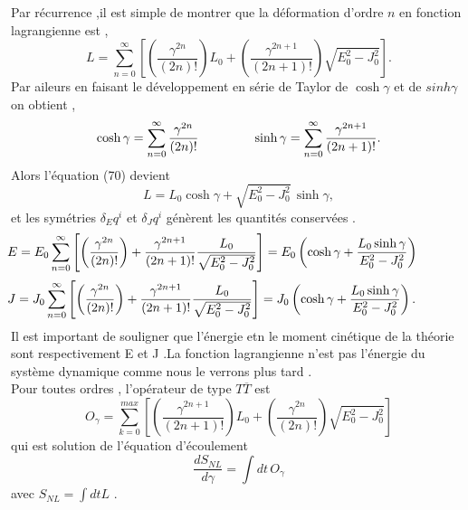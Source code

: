 \documentclass[12pt,a4paper, openany]{article}
\begin{document}
   \hspace{0.5cm}Par récurrence ,il est simple de montrer que la déformation d'ordre $n$ en fonction lagrangienne est ,
   \begin{equation}
   L=\sum_{n=0}^{\infty}\left[\left(\frac{\gamma^{2n}}{(2n)!}\right)L_0+\left(\frac{\gamma^{2n+1
   }}{(2n+1)!}\right)\sqrt{E^2_0-J_0^2}\right] .
   \end{equation}
   Par aileurs en faisant le développement en série de Taylor  de $\cosh{\gamma}$ et de $sinh{\gamma}$ on obtient ,
   \begin{equation}
   	\cosh{\gamma}=\sum_{n=0}^{\infty}\frac{\gamma^{2n}}{(2n)!} \hspace{1.5cm} \sinh{\gamma}=\sum_{n=0}^{\infty} \frac{\gamma^{2n+1
   	}}{(2n+1)!} .
   \end{equation}
   Alors l'équation (70) devient 
   \begin{equation}
   L=L_0\cosh{\gamma}+\sqrt{E^2_0-J_0^2} \,\sinh{\gamma} ,
   \end{equation}
    et les symétries $ \delta_{E}q^{i}$ et $\delta_{J}q^i$ génèrent les quantités conservées .
    \begin{equation}
   \hspace{-1.5cm} E=E_0\sum_{n=0}^{\infty}\left[\left(\frac{\gamma^{2n}}{(2n)!}\right)+\frac{
    	\gamma^{2n+1}}{(2n+1)!}\frac{L_0}{\sqrt{E^2_0-J_0^2}}\right]=E_0\left(\cosh{\gamma}+\frac{L_0\sinh{\gamma}}{E^2_0-J_0^2}\right)
    \end{equation}
    \begin{equation}
    \hspace{-1.5cm}	J=J_0\sum_{n=0}^{\infty}\left[\left(\frac{\gamma^{2n}}{(2n)!}\right)+\frac{
    		\gamma^{2n+1}}{(2n+1)!}\frac{L_0}{\sqrt{E^2_0-J_0^2}}\right]=J_0\left(\cosh{\gamma}+\frac{L_0\sinh{\gamma}}{E^2_0-J_0^2}\right) .
    \end{equation}
    	Il est important de souligner que l'énergie etn le moment cinétique de la théorie sont respectivement E et J .La fonction lagrangienne n'est pas l'énergie du système dynamique comme nous le verrons plus tard .\\
    	
    	Pour toutes ordres , l'opérateur de type $T{\overline{T}}$ est 
    	\begin{equation}
    		O_{\gamma}=\sum_{k=0}^{max}\left[\left(\frac{\gamma^{2n+1}}{(2n+1)!}\right)L_0+\left(\frac{\gamma^{2n}}{(2n)!}\right)\sqrt{E^2_0-J_0^2}\right]
    	\end{equation}
    	qui est solution de l'équation d'écoulement 
    	\begin{equation}
    		\frac{dS_{NL}}{d{\gamma}}=\int dt\,O_{\gamma}
    	\end{equation}
    	avec $S_{NL}=\int dt L$ .
    	
\end{document}
